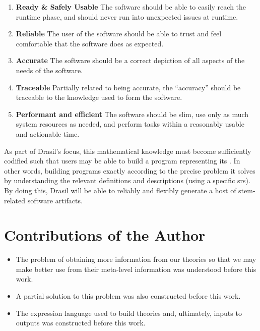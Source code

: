 \begin{enumerate}

      \item \textbf{Ready \& Safely Usable} The software should be able to
            easily reach the runtime phase, and should never run into unexpected
            issues at runtime.

      \item \textbf{Reliable} The user of the software should be able to trust
            and feel comfortable that the software does as expected.

      \item \textbf{Accurate} The software should be a correct depiction of all
            aspects of the needs of the software.

      \item \textbf{Traceable} Partially related to being accurate, the
            ``accuracy'' should be traceable to the knowledge used to form the
            software.

      \item \textbf{Performant and efficient} The software should be slim, use
            only as much system resources as needed, and perform tasks within a
            reasonably usable and actionable time.

\end{enumerate}

As part of Drasil's focus, this mathematical knowledge must become sufficiently
codified such that users may be able to build a program 
representing its . In other words, building programs exactly according
to the precise problem it solves by understanding the relevant definitions and
descriptions (using a specific \acs{srs}). By doing this, Drasil will be able to
reliably and flexibly generate a host of \acs{stem}-related software artifacts.

\section{Contributions of the Author}
\label{sec:intro:contributions}

\begin{itemize}
      \item The problem of obtaining more information from our theories so that
            we may make better use from their meta-level information was
            understood before this work.
      \item A partial solution to this problem was also constructed before this
            work.
      \item The expression language used to build theories and, ultimately,
            inputs to outputs was constructed before this work.
\end{itemize}


